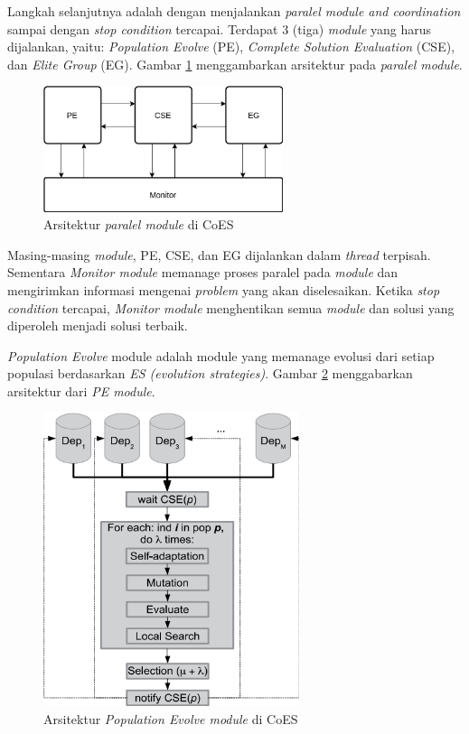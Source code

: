 Langkah selanjutnya adalah dengan menjalankan \textit{paralel module and coordination} sampai dengan \textit{stop condition} tercapai. Terdapat 3 (tiga) \textit{module} yang harus dijalankan, yaitu: \textit{Population Evolve} (PE), \textit{Complete Solution Evaluation} (CSE), dan \textit{Elite Group} (EG). Gambar \ref{fig:coes_paralel_modules} menggambarkan arsitektur pada \textit{paralel module}.


\begin{figure}[!]
	\centering
	\includegraphics[width=7cm]{../../Resources/Images/coes_paralel_modules}
	\caption{Arsitektur \textit{paralel module} di CoES}
	\label{fig:coes_paralel_modules}
\end{figure}


Masing-masing \textit{module}, PE, CSE, dan EG dijalankan dalam \textit{thread} terpisah. Sementara \textit{Monitor module} memanage proses paralel pada \textit{module} dan mengirimkan informasi mengenai \textit{problem} yang akan diselesaikan. Ketika \textit{stop condition} tercapai, \textit{Monitor module} menghentikan semua \textit{module} dan solusi yang diperoleh menjadi solusi terbaik.


\textit{Population Evolve} module adalah module yang memanage evolusi dari setiap populasi berdasarkan \textit{ES (evolution strategies)}. Gambar \ref{fig:coes_pe_module} menggabarkan arsitektur dari \textit{PE module}.


\begin{figure}[!]
	\centering
	\includegraphics[width=7.5cm]{../../Resources/Images/coes_pe_module}
	\caption{Arsitektur \textit{Population Evolve module} di CoES}
	\label{fig:coes_pe_module}
\end{figure}


